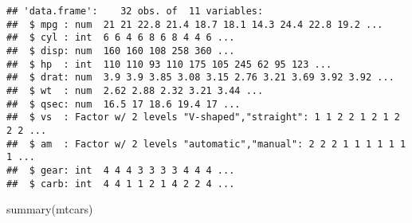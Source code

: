 \documentclass[
]{article}
\newenvironment{Shaded}{\begin{snugshade}}{\end{snugshade}}
\newcommand{\FunctionTok}[1]{\textcolor[rgb]{0.00,0.00,0.00}{#1}}
\newcommand{\NormalTok}[1]{#1}
\newcommand{\OtherTok}[1]{\textcolor[rgb]{0.56,0.35,0.01}{#1}}
\newcommand{\SpecialCharTok}[1]{\textcolor[rgb]{0.00,0.00,0.00}{#1}}
\newcommand{\StringTok}[1]{\textcolor[rgb]{0.31,0.60,0.02}{#1}}
\begin{document}
\begin{Shaded}
\end{Shaded}

\begin{verbatim}
## 'data.frame':    32 obs. of  11 variables:
##  $ mpg : num  21 21 22.8 21.4 18.7 18.1 14.3 24.4 22.8 19.2 ...
##  $ cyl : int  6 6 4 6 8 6 8 4 4 6 ...
##  $ disp: num  160 160 108 258 360 ...
##  $ hp  : int  110 110 93 110 175 105 245 62 95 123 ...
##  $ drat: num  3.9 3.9 3.85 3.08 3.15 2.76 3.21 3.69 3.92 3.92 ...
##  $ wt  : num  2.62 2.88 2.32 3.21 3.44 ...
##  $ qsec: num  16.5 17 18.6 19.4 17 ...
##  $ vs  : Factor w/ 2 levels "V-shaped","straight": 1 1 2 2 1 2 1 2 2 2 ...
##  $ am  : Factor w/ 2 levels "automatic","manual": 2 2 2 1 1 1 1 1 1 1 ...
##  $ gear: int  4 4 4 3 3 3 3 4 4 4 ...
##  $ carb: int  4 4 1 1 2 1 4 2 2 4 ...
\end{verbatim}

\begin{Shaded}
\begin{Highlighting}[]
\FunctionTok{summary}\NormalTok{(mtcars)}
\end{Highlighting}
\end{Shaded}
\end{document}
